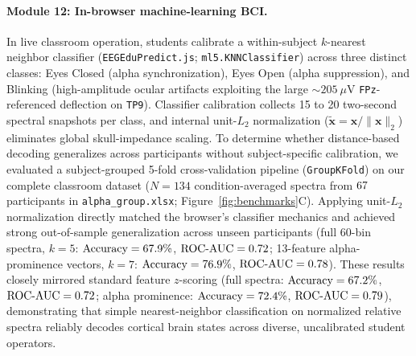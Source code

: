 \documentclass[11pt,letterpaper]{article}
\providecommand{\NBCIRecordings}{134}
\begin{document}
\paragraph{Module 12: In-browser machine-learning BCI.} In live classroom operation, students calibrate a within-subject $k$-nearest neighbor classifier (\texttt{EEGEduPredict.js}; \texttt{ml5.KNNClassifier}) across three distinct classes: Eyes Closed (alpha synchronization), Eyes Open (alpha suppression), and Blinking (high-amplitude ocular artifacts exploiting the large $\sim 205\ \mu\text{V}$ \texttt{FPz}-referenced deflection on \texttt{TP9}). Classifier calibration collects 15 to 20 two-second spectral snapshots per class, and internal unit-$L_2$ normalization ($\tilde{\mathbf{x}} = \mathbf{x}/\|\mathbf{x}\|_2$) eliminates global skull-impedance scaling. To determine whether distance-based decoding generalizes across participants without subject-specific calibration, we evaluated a subject-grouped 5-fold cross-validation pipeline (\texttt{GroupKFold}) on our complete classroom dataset ($N = \NBCIRecordings$ condition-averaged spectra from $67$ participants in \texttt{alpha\_group.xlsx}; Figure~\ref{fig:benchmarks}C). Applying unit-$L_2$ normalization directly matched the browser's classifier mechanics and achieved strong out-of-sample generalization across unseen participants (full 60-bin spectra, $k=5$: $\text{Accuracy} = 67.9\%$, $\text{ROC-AUC} = 0.72$; 13-feature alpha-prominence vectors, $k=7$: $\text{Accuracy} = 76.9\%$, $\text{ROC-AUC} = 0.78$). These results closely mirrored standard feature $z$-scoring (full spectra: $\text{Accuracy} = 67.2\%$, $\text{ROC-AUC} = 0.72$; alpha prominence: $\text{Accuracy} = 72.4\%$, $\text{ROC-AUC} = 0.79$), demonstrating that simple nearest-neighbor classification on normalized relative spectra reliably decodes cortical brain states across diverse, uncalibrated student operators.
\end{document}
